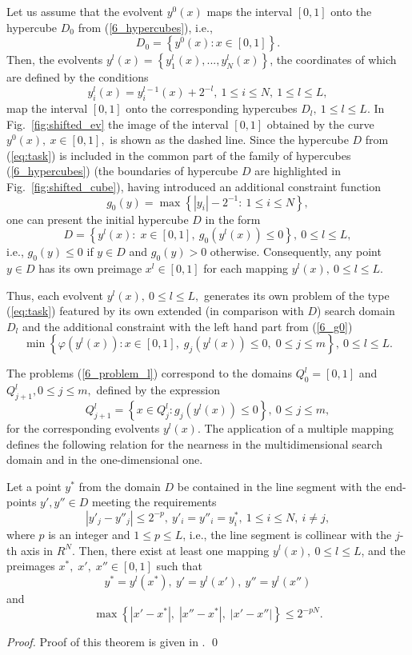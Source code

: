 \documentclass[runningheads]{llncs}
\begin{document}
Let us assume that the evolvent $y^0(x)$  maps the interval $[0,1]$ onto the hypercube $D_0$ from (\ref{6_hypercubes}), i.e.,
\[
D_0 = \left\{y^0(x) : x \in [0,1]\right\}.
\]
Then, the evolvents $y^l(x)=\left\{y_1^l(x),...,y_N^l(x)\right\}$, the coordinates of which are defined by the conditions
\[
y_i^l(x)=y_i^{l-1}(x)+2^{-l},\ 1\leq i\leq N, \ 1\leq l\leq L,
\]
map the interval $[0,1]$ onto the corresponding hypercubes $D_l,\ 1\leq l \leq L$. In Fig.~\ref{fig:shifted_ev} the image of the interval $[0,1]$ obtained by the curve $y^0(x),\ x\in [0,1],$ is shown as the dashed line. Since the hypercube $D$ from (\ref{eq:task}) is included in the common part of the family of hypercubes (\ref{6_hypercubes}) (the boundaries of hypercube $D$ are highlighted in Fig.~\ref{fig:shifted_cube}), having introduced an additional constraint function
\begin{equation}\label{6_g0}
g_0(y)=\max\left\{\left|y_i\right| - 2^{-1}:\ 1\leq i\leq N\right\},
\end{equation}
one can present the initial hypercube $D$ in the form
\[
D=\left\{y^l(x):\; x\in [0,1],\ g_0(y^l(x))\leq 0 \right\},\ 0\leq l \leq L,
\]
i.e., $g_0(y) \leq 0$ if $y\in D$ and $g_0(y)>0$ otherwise. Consequently, any point $y \in D$ has its own preimage $x^l \in [0,1]$ for each mapping $y^l(x),\ 0\leq l\leq L$.

Thus, each evolvent $y^l(x),\ 0\leq l \leq L,$ generates its own problem of the type (\ref{eq:task}) featured by its own extended (in comparison with $D$) search domain $D_l$ and the additional constraint with the left hand part from (\ref{6_g0})
\begin{equation}\label{6_problem_l}
\min{\left\{\varphi(y^l(x)):x\in [0,1], \; g_j(y^l(x))\leq 0, \; 0 \leq j \leq m\right\}}, \ 0 \leq l \leq L.
\end{equation}

The problems (\ref{6_problem_l}) correspond to the domains $Q_0^l=[0,1]$ and $Q_{j+1}^l, 0 \leq j \leq m,$ defined by the expression
\[
Q_{j+1}^l = \left\{x \in Q_j^l:g_j(y^l(x))\leq 0\right\},\ 0\leq j\leq m,
\]
for the corresponding evolvents $y^l(x)$. The application of a multiple mapping defines the following relation for the nearness in the multidimensional search domain and in the one-dimensional one.

\begin{theorem}
Let a point $y^\ast$ from the domain $D$ be contained in the line segment with the end-points $y',y'' \in D$ meeting the requirements
\[
\left|y'_j - y''_j\right|\leq 2^{-p},\ y'_i=y''_i=y^\ast_i, \ 1\leq i \leq N,\ i \neq j,
\]
where $p$ is an integer  and $1\leq p \leq L$, i.e., the line segment is collinear with the $j$-th axis in $R^N$. Then, there exist at least one mapping $y^l(x),\ 0\leq l\leq L$, and the preimages $x^\ast,\; x',\; x''\in [0,1]$ such that
\[
y^\ast = y^l(x^\ast),\ y'=y^l(x'),\ y'' = y^l(x'')
\]
and
\[
\max \left\{ \left|x'-x^\ast\right|,\; \left|x''-x^\ast\right|,\; \left|x'-x''\right|\right\} \leq 2^{-pN}.
\]
\end{theorem}
\begin{proof}
Proof of this theorem is given in \cite{strSergGO}.
\qed
\end{proof}
\end{document}
